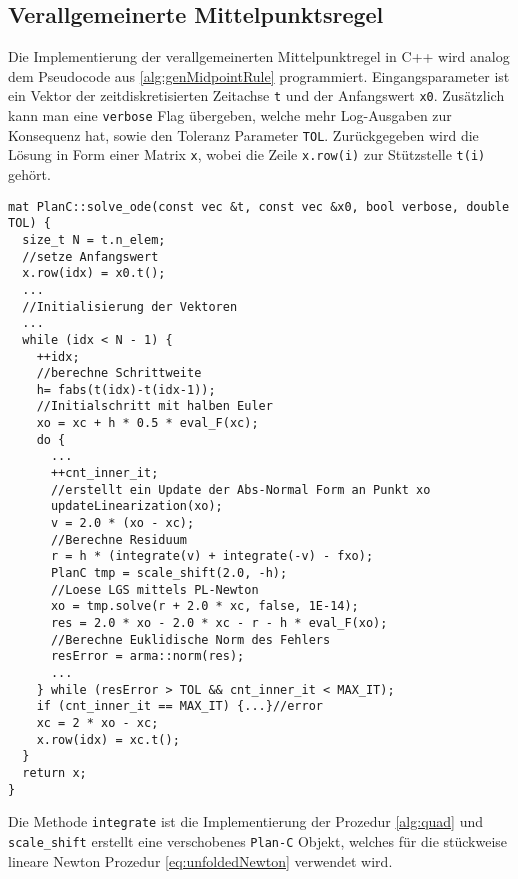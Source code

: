 \subsection{Verallgemeinerte Mittelpunktsregel}
Die Implementierung der verallgemeinerten Mittelpunktregel in C++ wird analog dem Pseudocode aus \ref{alg:genMidpointRule} programmiert. Eingangsparameter ist ein Vektor der zeitdiskretisierten Zeitachse \texttt{t} und der Anfangswert \texttt{x0}. Zusätzlich kann man eine \texttt{verbose} Flag übergeben, welche mehr Log-Ausgaben zur Konsequenz hat, sowie den Toleranz Parameter \texttt{TOL}. Zurückgegeben wird die Lösung in Form einer Matrix \texttt{x}, wobei die Zeile \texttt{x.row(i)} zur Stützstelle \texttt{t(i)} gehört.
\begin{lstlisting}[caption=Verallgemeinerte Mittelpunktsregel,label=lst:genMidpointRule]
 mat PlanC::solve_ode(const vec &t, const vec &x0, bool verbose, double TOL) {
  size_t N = t.n_elem;
  //setze Anfangswert
  x.row(idx) = x0.t();
  ...
  //Initialisierung der Vektoren
  ...	
  while (idx < N - 1) {
    ++idx;
    //berechne Schrittweite
    h= fabs(t(idx)-t(idx-1));
    //Initialschritt mit halben Euler
    xo = xc + h * 0.5 * eval_F(xc);		
    do {
      ... 
      ++cnt_inner_it;
      //erstellt ein Update der Abs-Normal Form an Punkt xo
      updateLinearization(xo);
      v = 2.0 * (xo - xc);
      //Berechne Residuum
      r = h * (integrate(v) + integrate(-v) - fxo);
      PlanC tmp = scale_shift(2.0, -h);
      //Loese LGS mittels PL-Newton
      xo = tmp.solve(r + 2.0 * xc, false, 1E-14);
      res = 2.0 * xo - 2.0 * xc - r - h * eval_F(xo);
      //Berechne Euklidische Norm des Fehlers
      resError = arma::norm(res);
      ...
    } while (resError > TOL && cnt_inner_it < MAX_IT);
    if (cnt_inner_it == MAX_IT) {...}//error
    xc = 2 * xo - xc;    
    x.row(idx) = xc.t();
  }
  return x;
}
\end{lstlisting}
Die Methode \texttt{integrate} ist die Implementierung der Prozedur \ref{alg:quad} und \texttt{scale\_shift} erstellt eine verschobenes \texttt{Plan-C} Objekt, welches für die stückweise lineare Newton Prozedur \ref{eq:unfoldedNewton} verwendet wird.
